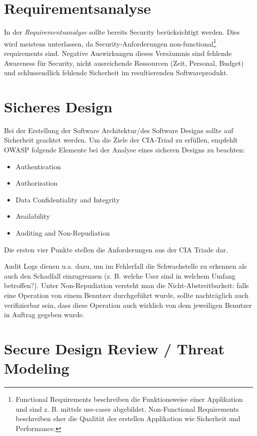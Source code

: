 \section{Requirementsanalyse}

In der \textit{Requirementsanalyse} sollte bereits Security berücksichtigt werden. Dies wird meistens unterlassen, da Security-Anforderungen non-functional\footnote{Functional Requirements beschreiben die Funktionsweise einer Applikation und sind z. B. mittels use-cases abgebildet. Non-Functional Requirements beschreiben eher die Qualität der erstellen Applikation wie Sicherheit und Performance.} requirements sind. Negative Auswirkungen dieses Versäumnis sind fehlende Awareness für Security, nicht ausreichende Ressourcen (Zeit, Personal, Budget) und schlussendlich fehlende Sicherheit im resultierenden Softwareprodukt.

\section{Sicheres Design}

Bei der Erstellung der Software Architektur/des Software Designs sollte auf Sicherheit geachtet werden. Um die Ziele der CIA-Triad zu erfüllen, empfehlt OWASP folgende Elemente bei der Analyse eines sicheren Designs zu beachten:

\begin{itemize}
	\item Authentication
	\item Authorization
	\item Data Confidentiality and Integrity
	\item Availability
	\item Auditing and Non-Repudiation
\end{itemize}

Die ersten vier Punkte stellen die Anforderungen aus der CIA Triade dar.

Audit Logs dienen u.a. dazu, um im Fehlerfall die Schwachstelle zu erkennen als auch den Schadfall einzugrenzen (z. B. welche User sind in welchem Umfang betroffen?). Unter Non-Repudiation versteht man die Nicht-Abstreitbarkeit: falls eine Operation von einem Benutzer durchgeführt wurde, sollte nachträglich auch verifizierbar sein, dass diese Operation auch wirklich von dem jeweiligen Benutzer in Auftrag gegeben wurde.

\section{Secure Design Review / Threat Modeling}

